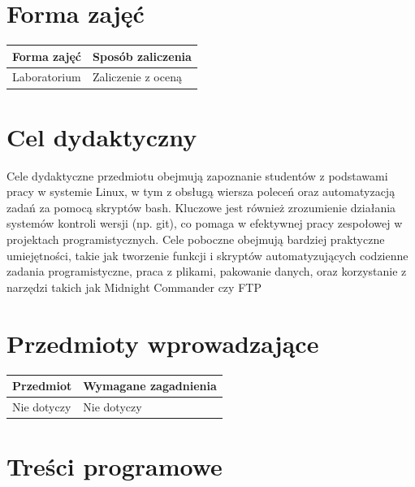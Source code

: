 \documentclass[12pt, a4paper]{article}
\begin{document}
\section{Forma zajęć}

\begin{tabular}{ll}
  \hline
  \textbf{Forma zajęć} & \textbf{Sposób zaliczenia} \\
  \hline
  Laboratorium & Zaliczenie z oceną \\
  \hline
\end{tabular}

\section{Cel dydaktyczny}

Cele dydaktyczne przedmiotu obejmują zapoznanie studentów z podstawami pracy w systemie Linux, w tym z obsługą wiersza poleceń oraz automatyzacją zadań za pomocą skryptów bash. Kluczowe jest również zrozumienie działania systemów kontroli wersji (np. git), co pomaga w efektywnej pracy zespołowej w projektach programistycznych. Cele poboczne obejmują bardziej praktyczne umiejętności, takie jak tworzenie funkcji i skryptów automatyzujących codzienne zadania programistyczne, praca z plikami, pakowanie danych, oraz korzystanie z narzędzi takich jak Midnight Commander czy FTP

\section{Przedmioty wprowadzające}

\begin{tabularx}{\textwidth}{lX}
  \hline
  \textbf{Przedmiot} & \textbf{Wymagane zagadnienia} \\
  \hline
  Nie dotyczy & Nie dotyczy \\
  \hline
\end{tabularx}

\section{Treści programowe}
\end{document}
